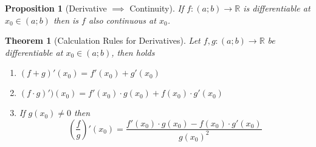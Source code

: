 \documentclass[english,titlepage]{uzhpub}
\theoremstyle{definition}
\theoremstyle{plain}
\newtheorem{proposition}[definition]{Proposition}
\newtheorem{theorem}[definition]{Theorem} %
\theoremstyle{remark}
\theoremstyle{example}
\begin{document}
   \begin{proposition}[Derivative \(\implies\) Continuity]\label{pro:deri_impl_cont}
      If \(f: (a; b) \to \mathbb{R}\) is differentiable at \(x_0 \in (a; b)\) then is \(f\) also continuous at \(x_0\).
   \end{proposition}

   \begin{theorem}[Calculation Rules for Derivatives]\label{thm:calc_rules_deriv}
      Let \(f, g: (a; b) \to \mathbb{R}\) be differentiable at \(x_0 \in (a; b)\), then holds
      \begin{enumerate}[label=\roman*, align=Center]
         \item \((f + g)'(x_0) = f'(x_0) + g'(x_0)\)
         \item \((f \cdot g)')(x_0) = f'(x_0) \cdot g(x_0) + f(x_0) \cdot g'(x_0)\)
         \item If \(g(x_0) \neq 0\) then
            \[\left(\frac{f}{g}\right)'(x_0) = \frac{f'(x_0)\cdot g(x_0) - f(x_0) \cdot g'(x_0)}{g(x_0)^2}\]
      \end{enumerate}
   \end{theorem}
\end{document}
